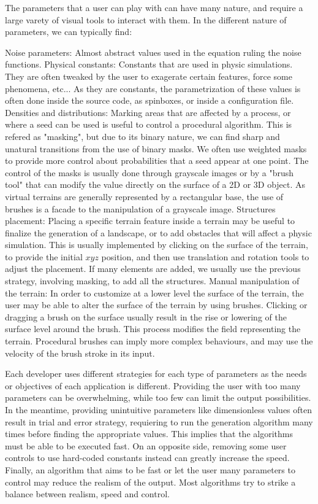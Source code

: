 The parameters that a user can play with can have many nature, and require a large varety of visual tools to interact with them. In the different nature of parameters, we can typically find: 
\begin{Itemize}
    \Item{} Noise parameters: Almost abstract values used in the equation ruling the noise functions. 
    \Item{} Physical constants: Constants that are used in physic simulations. They are often tweaked by the user to exagerate certain features, force some phenomena, etc... As they are constants, the parametrization of these values is often done inside the source code, as spinboxes, or inside a configuration file. 
    \Item{} Densities and distributions: Marking areas that are affected by a process, or where a seed can be used is useful to control a procedural algorithm. This is refered as "masking", but due to its binary nature, we can find sharp and unatural transitions from the use of binary masks. We often use weighted masks to provide more control about probabilities that a seed appear at one point. The control of the masks is usually done through grayscale images or by a "brush tool" that can modify the value directly on the surface of a 2D or 3D object. As virtual terrains are generally represented by a rectangular base, the use of brushes is a facade to the manipulation of a grayscale image.
    \Item{} Structures placement: Placing a specific terrain feature inside a terrain may be useful to finalize the generation of a landscape, or to add obstacles that will affect a physic simulation. This is usually implemented by clicking on the surface of the terrain, to provide the initial $xyz$ position, and then use translation and rotation tools to adjust the placement. If many elements are added, we usually use the previous strategy, involving masking, to add all the structures.
    \Item{} Manual manipulation of the terrain: In order to customize at a lower level the surface of the terrain, the user may be able to alter the surface of the terrain by using brushes. Clicking or dragging a brush on the surface usually result in the rise or lowering of the surface level around the brush. This process modifies the field representing the terrain. Procedural brushes can imply more complex behaviours, and may use the velocity of the brush stroke in its input.
\end{Itemize}

Each developer uses different strategies for each type of parameters as the needs or objectives of each application is different. Providing the user with too many parameters can be overwhelming, while too few can limit the output possibilities. In the meantime, providing unintuitive parameters like dimensionless values often result in trial and error strategy, requiering to run the generation algorithm many times before finding the appropriate values. This implies that the algorithms must be able to be executed fast. On an opposite side, removing some user controls to use hard-coded constants instead can greatly increase the speed. Finally, an algorithm that aims to be fast or let the user many parameters to control may reduce the realism of the output. Most algorithms try to strike a balance between realism, speed and control.

